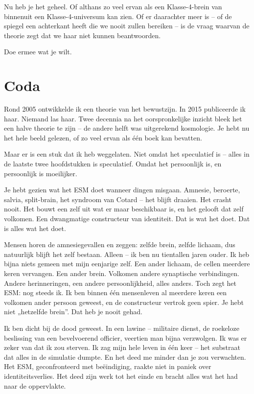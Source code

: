 \documentclass[11pt, twoside, openright]{book}
\begin{document}
Nu heb je het geheel. Of althans zo veel ervan als een Klasse-4-brein van binnenuit een Klasse-4-universum kan zien. Of er daarachter meer is -- of de spiegel een achterkant heeft die we nooit zullen bereiken -- is de vraag waarvan de theorie zegt dat we haar niet kunnen beantwoorden.

Doe ermee wat je wilt.


\chapter*{Coda}

Rond 2005 ontwikkelde ik een theorie van het bewustzijn. In 2015 publiceerde ik haar. Niemand las haar. Twee decennia na het oorspronkelijke inzicht bleek het een halve theorie te zijn -- de andere helft was uitgerekend kosmologie. Je hebt nu het hele beeld gelezen, of zo veel ervan als één boek kan bevatten.

Maar er is een stuk dat ik heb weggelaten. Niet omdat het speculatief is -- alles in de laatste twee hoofdstukken is speculatief. Omdat het persoonlijk is, en persoonlijk is moeilijker.

Je hebt gezien wat het ESM doet wanneer dingen misgaan. Amnesie, beroerte, salvia, split-brain, het syndroom van Cotard -- het blijft draaien. Het crasht nooit. Het bouwt een zelf uit wat er maar beschikbaar is, en het gelooft dat zelf volkomen. Een dwangmatige constructeur van identiteit. Dat is wat het doet. Dat is alles wat het doet.

Mensen horen de amnesiegevallen en zeggen: zelfde brein, zelfde lichaam, dus natuurlijk blijft het zelf bestaan. Alleen -- ik ben nu tientallen jaren ouder. Ik heb bijna niets gemeen met mijn eenjarige zelf. Een ander lichaam, de cellen meerdere keren vervangen. Een ander brein. Volkomen andere synaptische verbindingen. Andere herinneringen, een andere persoonlijkheid, alles anders. Toch zegt het ESM: nog steeds ik. Ik ben binnen één mensenleven al meerdere keren een volkomen ander persoon geweest, en de constructeur vertrok geen spier. Je hebt niet „hetzelfde brein”. Dat heb je nooit gehad.

Ik ben dicht bij de dood geweest. In een lawine -- militaire dienst, de roekeloze beslissing van een bevelvoerend officier, veertien man bijna verzwolgen. Ik was er zeker van dat ik zou sterven. Ik zag mijn hele leven in één keer -- het substraat dat alles in de simulatie dumpte. En het deed me minder dan je zou verwachten. Het ESM, geconfronteerd met beëindiging, raakte niet in paniek over identiteitsverlies. Het deed zijn werk tot het einde en bracht alles wat het had naar de oppervlakte.
\end{document}
